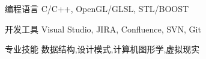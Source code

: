 


\begin{cvskills}


\cvskill
{编程语言} %
{C/C++, OpenGL/GLSL, STL/BOOST} %


\cvskill
{开发工具} %
{Visual Studio, JIRA, Confluence, SVN, Git} %


\cvskill
{专业技能} %
{数据结构,设计模式,计算机图形学,虚拟现实} %

\end{cvskills}